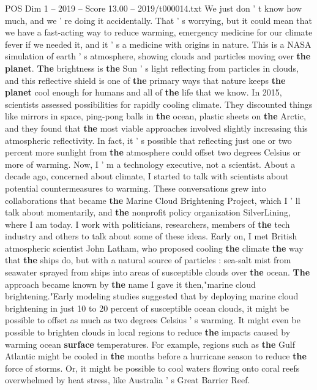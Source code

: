 \begin{textsample}{POS Dim 1 – 2019 – Score 13.00 – 2019/t000014.txt}
We just don ' t know how much, and we ' re doing it accidentally.
That ' s worrying, but it could mean that we have a fast-acting way to reduce warming, emergency medicine for our climate fever if we needed it, and it ' s a medicine with origins in nature.
This is a NASA simulation of earth ' s atmosphere, showing clouds and particles moving over \textbf{the} \textbf{planet}. \textbf{The} brightness is \textbf{the} Sun ' s light reflecting from particles in clouds, and this reflective shield is one of \textbf{the} primary ways that nature keeps \textbf{the} \textbf{planet} cool enough for humans and all of \textbf{the} life that we know.
In 2015, scientists assessed possibilities for rapidly cooling climate.
They discounted things like mirrors in space, ping-pong balls in \textbf{the} ocean, plastic sheets on \textbf{the} Arctic, and they found that \textbf{the} most viable approaches involved slightly increasing this atmospheric reflectivity.
In fact, it ' s possible that reflecting just one or two percent more sunlight from \textbf{the} atmosphere could offset two degrees Celsius or more of warming.
Now, I ' m a technology executive, not a scientist.
About a decade ago, concerned about climate, I started to talk with scientists about potential countermeasures to warming.
These conversations grew into collaborations that became \textbf{the} Marine Cloud Brightening Project, which I ' ll talk about momentarily, and \textbf{the} nonprofit policy organization SilverLining, where I am today.
I work with politicians, researchers, members of \textbf{the} tech industry and others to talk about some of these ideas.
Early on, I met British atmospheric scientist John Latham, who proposed cooling \textbf{the} climate \textbf{the} way that \textbf{the} ships do, but with a natural source of particles : sea-salt mist from seawater sprayed from ships into areas of susceptible clouds over \textbf{the} ocean. \textbf{The} approach became known by \textbf{the} name I gave it then,"marine cloud brightening."Early modeling studies suggested that by deploying marine cloud brightening in just 10 to 20 percent of susceptible ocean clouds, it might be possible to offset as much as two degrees Celsius ' s warming.
It might even be possible to brighten clouds in local regions to reduce \textbf{the} impacts caused by warming ocean \textbf{surface} temperatures.
For example, regions such as \textbf{the} Gulf Atlantic might be cooled in \textbf{the} months before a hurricane season to reduce \textbf{the} force of storms.
Or, it might be possible to cool waters flowing onto coral reefs overwhelmed by heat stress, like Australia ' s Great Barrier Reef.

\end{textsample}
